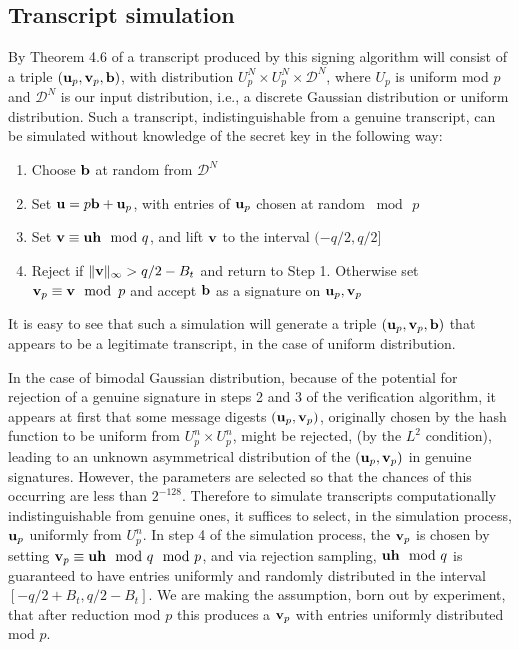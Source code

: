 \documentclass{llncs}
\newcommand{\bfb}{{\bf b}}
\newcommand{\bfh}{{\bf h}}
\newcommand{\bfu}{{\bf u}}
\newcommand{\bfv}{{\bf v}}
\newcommand{\<}{\langle}
\renewcommand{\>}{\rangle}
\begin{document}
\subsection{Transcript simulation}
By Theorem 4.6 of  \cite{lyu12} a transcript produced by this signing algorithm will consist of a triple $(\bfu_p,\bfv_p,\bfb)$, with distribution $U_p^N \times U_p^N \times \mathcal{D}^N$, where $U_p$ is uniform mod $p$ and $\mathcal{D}^N$ is our input distribution, i.e.,  a discrete Gaussian distribution or uniform distribution.
Such a transcript, indistinguishable from a genuine transcript, can be simulated without knowledge of the secret key in the following way: 

\begin{enumerate}
\item
Choose $\bfb$ at random from  $\mathcal{D}^N$
\item
Set $\bfu = p\bfb +\bfu_p$, with entries of $\bfu_p$ chosen at random 
$\bmod \,p$ 
\item
Set $\bfv \equiv \bfu \bfh \mod q$, and lift $\bfv$ to the interval $(-q/2,q/2]$
\item
Reject if  $\| \bfv\|_\infty >q/2 - B_t$ and return to Step 1.  Otherwise 
set $\bfv_p \equiv \bfv \mod \, p$ and  accept 
$\bfb$ as a signature on $\bfu_p, \bfv_p$
\end{enumerate}

It is easy to see that such a simulation will generate a triple 
$(\bfu_p,\bfv_p,\bfb)$ that appears to be a legitimate transcript, in
the case of uniform distribution.

In the case of bimodal Gaussian distribution, 
because of the potential for rejection of a genuine signature in steps 2 and 3 of the verification algorithm,  it appears at first that some message digests $(\bfu_p,\bfv_p)$, originally chosen by the hash function to be uniform from $U_p^n \times U_p^n$, might be rejected, (by the $L^2$ condition), leading to an unknown asymmetrical distribution of the $(\bfu_p,\bfv_p)$ in genuine signatures.   However, the parameters are selected so that the chances of this occurring are less than $2^{-128}$.   Therefore to simulate transcripts computationally indistinguishable from genuine ones, it suffices to 
select, in the simulation process, $\bfu_p$ uniformly from $U_p^n$.   In step 4 of the simulation process, the $\bfv_p$ is chosen by setting $\bfv_p \equiv  \bfu \bfh \mod q \mod p$, and via rejection sampling, $\bfu \bfh \mod q$ is guaranteed to have entries uniformly and randomly distributed in the interval $[-q/2+B_t,q/2-B_t]$.  We are making the assumption, born out by experiment, that after reduction mod $p$ this produces a $\bfv_p$ with entries uniformly distributed mod $p$.
\end{document}
